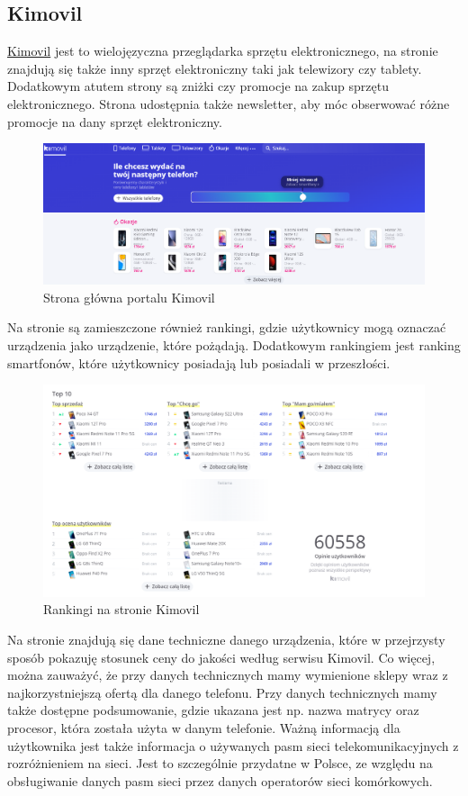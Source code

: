 \subsection{Kimovil}
\href{https://www.kimovil.com/pl/}{Kimovil} \cite{kimovil} jest to wielojęzyczna przeglądarka sprzętu elektronicznego, na stronie znajdują się także inny sprzęt elektroniczny taki jak telewizory czy tablety. Dodatkowym atutem strony są zniżki czy promocje na zakup sprzętu elektronicznego. Strona udostępnia także newsletter, aby móc obserwować różne promocje na dany sprzęt elektroniczny.
\begin{figure}[H]
    \centering
    \includegraphics[width=15cm]{img/Kimovil/kimovil.png}
    \caption{Strona główna portalu Kimovil}
    \label{kimovil_1}
\end{figure}
Na stronie są zamieszczone również rankingi, gdzie użytkownicy mogą oznaczać urządzenia jako urządzenie, które pożądają. Dodatkowym rankingiem jest ranking smartfonów, które użytkownicy posiadają lub posiadali w przeszłości. 
\begin{figure}[H]
    \centering
    \includegraphics[width=15cm]{img/Kimovil/rankingsKimovil.png}
    \caption{Rankingi na stronie Kimovil}
    \label{kimovil_2}
\end{figure}
Na stronie znajdują się dane techniczne danego urządzenia, które w przejrzysty sposób pokazuję stosunek ceny do jakości według serwisu Kimovil. Co więcej, można zauważyć, że przy danych technicznych mamy wymienione sklepy wraz z najkorzystniejszą ofertą dla danego telefonu. Przy danych technicznych mamy także dostępne podsumowanie, gdzie ukazana jest np. nazwa matrycy oraz procesor, która została użyta w danym telefonie. Ważną informacją dla użytkownika jest także informacja o używanych pasm sieci telekomunikacyjnych z rozróżnieniem na sieci. Jest to szczególnie przydatne w Polsce, ze względu na obsługiwanie danych pasm sieci przez danych operatorów sieci komórkowych.
